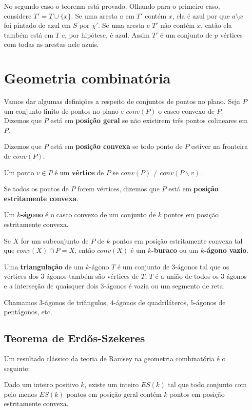 No segundo caso o teorema está provado. Olhando para o primeiro caso, considere $T'=T\cup\{x\}$. Se uma aresta $a$ em $T'$ contém $x$, ela é azul por que $a\setminus x$ foi pintado de azul em $S$ por $\chi'$. Se uma aresta e $T'$ não contém $x$, então ela também está em $T$ e, por hipótese, é azul. Assim $T'$ é um conjunto de $p$ vértices com todas as arestas nele azuis.

\section{Geometria combinatória}
Vamos dar algumas definições a respeito de conjuntos de pontos no plano. Seja $P$ um conjunto finito de pontos no plano e $conv(P)$ o casco convexo de $P$. Dizemos que $P$ está em \textbf{posição geral} se não existirem três pontos colineares em $P$. 

Dizemos que $P$ está em \textbf{posição convexa} se todo ponto de $P$ estiver na fronteira de $conv(P)$.

Um ponto $v\in P$ é um \textbf{vértice} de $P$ se $conv(P)\neq conv(P\backslash v)$.

Se todos os pontos de $P$ forem vértices, dizemos que $P$ está em \textbf{posição estritamente convexa}.

Um \textbf{$k$-ágono} é o casco convexo de um conjunto de $k$ pontos em posição estritamente convexa.

Se $X$ for um subconjunto de $P$ de $k$ pontos em posição estritamente convexa tal que $conv(X)\cap P=X$, então  $conv(X)$ é um \textbf{$k$-buraco} ou um \textbf{$k$-ágono vazio}.

Uma \textbf{triangulação} de um $k$-ágono $T$ é um conjunto de $3$-ágonos tal que os vértices dos $3$-ágonos também são vértices de $T$, $T$ é a união de todos os $3$-ágonos e a interseção de quaisquer dois $3$-ágonos é vazia ou um segmento de reta.

Chamamos $3$-ágonos de triângulos, $4$-ágonos de quadriláteros, $5$-ágonos de pentágonos, etc.

\subsection{Teorema de Erd\H os-Szekeres}
Um resultado clássico da teoria de Ramsey na geometria combinatória é o seguinte:
\begin{teorema}
    Dado um inteiro positivo $k$, existe um inteiro $ES(k)$ tal que todo conjunto com pelo menos $ES(k)$ pontos em posição geral contém $k$ pontos em posição estritamente convexa.
\end{teorema}

